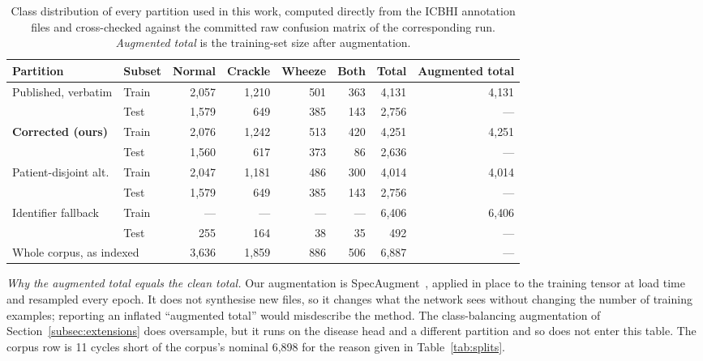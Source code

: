 \documentclass[journal,onecolumn]{IEEEtran}
\newcommand{\best}[1]{\textbf{#1}}
\begin{document}
\begin{table}[!t]
\centering
\caption{Class distribution of every partition used in this work, computed
directly from the ICBHI annotation files and cross-checked against the committed
raw confusion matrix of the corresponding run. \emph{Augmented total} is the
training-set size after augmentation.}
\label{tab:classdist}
\small
\begin{tabular}{llrrrrrr}
\toprule
Partition & Subset & Normal & Crackle & Wheeze & Both & Total & Augmented total \\
\midrule
\multirow{2}{*}{Published, verbatim}
  & Train & 2{,}057 & 1{,}210 & 501 & 363 & 4{,}131 & 4{,}131 \\
  & Test  & 1{,}579 & \phantom{0}649 & 385 & 143 & 2{,}756 & --- \\
\midrule
\multirow{2}{*}{\best{Corrected (ours)}}
  & Train & 2{,}076 & 1{,}242 & 513 & 420 & 4{,}251 & 4{,}251 \\
  & Test  & 1{,}560 & \phantom{0}617 & 373 & \phantom{0}86 & 2{,}636 & --- \\
\midrule
\multirow{2}{*}{Patient-disjoint alt.}
  & Train & 2{,}047 & 1{,}181 & 486 & 300 & 4{,}014 & 4{,}014 \\
  & Test  & 1{,}579 & \phantom{0}649 & 385 & 143 & 2{,}756 & --- \\
\midrule
\multirow{2}{*}{Identifier fallback}
  & Train & --- & --- & --- & --- & 6{,}406 & 6{,}406 \\
  & Test  & \phantom{0,}255 & \phantom{0}164 & \phantom{0}38 & \phantom{0}35 & \phantom{0,}492 & --- \\
\midrule
\multicolumn{2}{l}{Whole corpus, as indexed} & 3{,}636 & 1{,}859 & 886 & 506 & 6{,}887 & --- \\
\bottomrule
\end{tabular}

\vspace{2pt}
\footnotesize \emph{Why the augmented total equals the clean total.} Our
augmentation is SpecAugment~\cite{park2019specaugment}, applied in place to the
training tensor at load time and resampled every epoch. It does not synthesise new
files, so it changes what the network sees without changing the number of training
examples; reporting an inflated ``augmented total'' would misdescribe the method.
The class-balancing augmentation of Section~\ref{subsec:extensions} does
oversample, but it runs on the disease head and a different partition and so does
not enter this table. The corpus row is 11 cycles short of the corpus's nominal
6{,}898 for the reason given in Table~\ref{tab:splits}.
\end{table}
\end{document}
